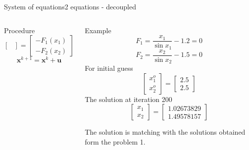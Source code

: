 \documentclass{beamer}
\begin{document}
\begin{frame}{System of equations}{2 equations - decoupled}
\begin{columns}[t]
\begin{block}{\footnotesize Procedure}
\[\begin{bmatrix}
                \end{bmatrix}
                =
                \begin{bmatrix}
                    -F_1(x_1) \\
                    -F_2(x_2) 
                \end{bmatrix}
            \]
            \[\textbf{x}^{k+1}=\textbf{x}^k+\textbf{u}\]
        \end{block}
        \begin{block}{\footnotesize Example}
            \scriptsize
            \[
                F_1 =\frac{x_1}{\sin x_1} - 1.2 = 0
            \]
            \[
                F_2 =\frac{x_2}{\sin x_2} - 1.5 = 0
            \]
            For initial guess
            \vspace{-1em}
            \[
                \begin{bmatrix}
                    x_1^o \\ x_2^o
                \end{bmatrix}
                =
                \begin{bmatrix}
                    2.5 \\ 2.5
                \end{bmatrix}
            \]
            The solution at iteration 200
            \vspace{-0.8em}
            \[
                \begin{bmatrix}
                    x_1 \\ x_2
                \end{bmatrix}
                =
                \begin{bmatrix}
                    1.02673829 \\ 1.49578157
                \end{bmatrix}
            \]

            The solution is matching with the solutions obtained form the problem 1.
        \end{block}
        \vfill
    \end{columns}
\end{frame}
\end{document}
